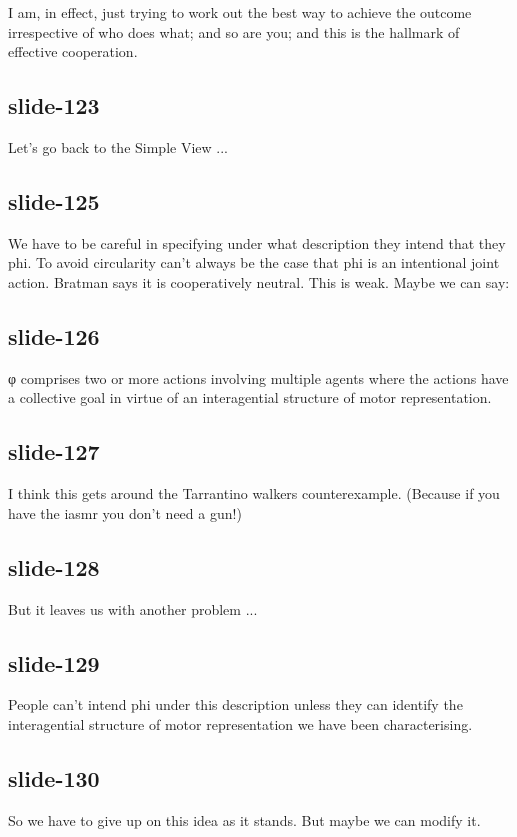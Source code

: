 \documentclass[12pt,\papersize]{extarticle}
\begin{document}
I am, in effect, just trying to work out the best way to achieve the outcome irrespective
of who does what; and so are you; and this is the hallmark of effective cooperation.

\subsection{slide-123}
Let's go back to the Simple View ...

\subsection{slide-125}
We have to be careful in specifying under what description they intend that they phi.
To avoid circularity can't always be the case that phi is an intentional joint action.
Bratman says it is cooperatively neutral.
This is weak.
Maybe we can say:

\subsection{slide-126}
φ comprises two or more actions involving multiple agents where the actions have a collective goal in virtue of an interagential structure of motor representation.

\subsection{slide-127}
I think this gets around the Tarrantino walkers counterexample.
(Because if you have the iasmr you don't need a gun!)

\subsection{slide-128}
But it leaves us with another problem ...

\subsection{slide-129}
People can't intend phi under this description unless they can identify the
interagential structure of motor representation we have been characterising.

\subsection{slide-130}
So we have to give up on this idea as it stands.
But maybe we can modify it.
\end{document}
